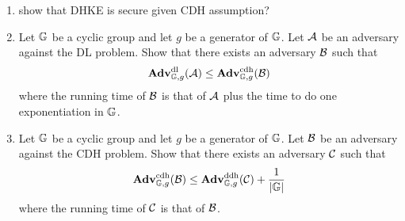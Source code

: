 \begin{enumerate}[label=\textbf{Exercise \thesection.\arabic*}, wide=0pt]
	\item show that DHKE is secure given CDH assumption?
	
	\item Let $\mathbb{G}$ be a cyclic group and let $g$ be a generator of $\mathbb{G}$. Let ${\mathcal A}$ be an adversary against the DL problem. Show that there exists an adversary ${\mathcal B}$ such that 
	\begin{equation*}
		\mathbf{Adv}^{\mathrm{dl}}_{\mathbb{G},g}({\mathcal A}) \leq \mathbf{Adv}^{\mathrm{cdh}}_{\mathbb{G},g}({\mathcal B})
	\end{equation*}
	where the running time of ${\mathcal B}$ is that of ${\mathcal A}$ plus the time to do one exponentiation in $\mathbb{G}$. 
	
	\item Let $\mathbb{G}$ be a cyclic group and let $g$ be a generator of $\mathbb{G}$. Let ${\mathcal B}$ be an adversary against the CDH problem. Show that there exists an adversary ${\mathcal C}$ such that 
	\begin{equation*}
	\mathbf{Adv}^{\mathrm{cdh}}_{\mathbb{G},g}({\mathcal B}) \leq \mathbf{Adv}^{\mathrm{ddh}}_{\mathbb{G},g}({\mathcal C}) + \frac{1}{|\mathbb{G}|}
	\end{equation*}
	where the running time of ${\mathcal C}$ is that of ${\mathcal B}$.
\end{enumerate}